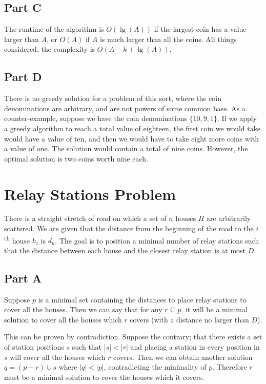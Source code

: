 \documentclass{article}
\begin{document}
\subsection*{Part C}

The runtime of the algorithm is \(O(\lg(A))\) if the largest coin has a value larger than \(A\), or \(O(A)\) if \(A\) is much larger than all the coins. All things considered, the complexity is \(O(A-k+\lg(A))\).

\subsection*{Part D}

There is no greedy solution for a problem of this sort, where the coin denominations are arbitrary, and are not powers of some common base. As a counter-example, suppose we have the coin denominations \(\{10, 9, 1\}\). If we apply a greedy algorithm to reach a total value of eighteen, the first coin we would take would have a value of ten, and then we would have to take eight more coins with a value of one. The solution would contain a total of nine coins. However, the optimal solution is two coins worth nine each.

\section{Relay Stations Problem}

There is a straight stretch of road on which a set of \(n\) houses \(H\) are arbitrarily scattered. We are given that the distance from the beginning of the road to the \(i\)\textsuperscript{th} house \(h_i\) is \(d_h\). The goal is to position a minimal number of relay stations such that the distance between each house and the closest relay station is at most \(D\).

\subsection*{Part A}

Suppose \(p\) is a minimal set containing the distances to place relay stations to cover all the houses. Then we can say that for any \(r \subseteq p\), it will be a minimal solution to cover all the houses which \(r\) covers (with a distance no larger than \(D\)).

This can be proven by contradiction. Suppose the contrary; that there exists a set of station positions \(s\) such that \(|s| < |r|\) and placing a station in every position in \(s\) will cover all the houses which \(r\) covers. Then we can obtain another solution \(q = (p - r) \cup s\) where \(|q| < |p|\), contradicting the minimality of \(p\). Therefore \(r\) must be a minimal solution to cover the houses which it covers.
\end{document}
